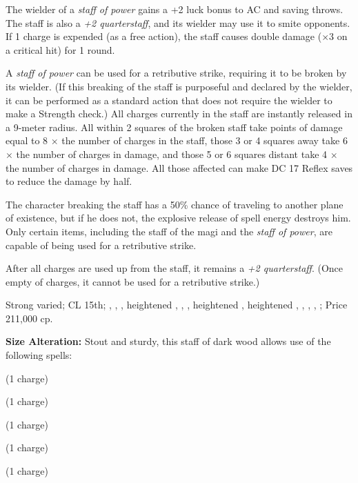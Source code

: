 The wielder of a \emph{staff of power} gains a +2 luck bonus to AC and saving throws. The staff is also a \emph{+2 quarterstaff}, and its wielder may use it to smite opponents. If 1 charge is expended (as a free action), the staff causes double damage ($\times$3 on a critical hit) for 1 round.

A \emph{staff of power} can be used for a retributive strike, requiring it to be broken by its wielder. (If this breaking of the staff is purposeful and declared by the wielder, it can be performed as a standard action that does not require the wielder to make a Strength check.) All charges currently in the staff are instantly released in a 9-meter radius. All within 2 squares of the broken staff take points of damage equal to 8 $\times$ the number of charges in the staff, those 3 or 4 squares away take 6 $\times$ the number of charges in damage, and those 5 or 6 squares distant take 4 $\times$ the number of charges in damage. All those affected can make DC 17 Reflex saves to reduce the damage by half.

The character breaking the staff has a 50\% chance of traveling to another plane of existence, but if he does not, the explosive release of spell energy destroys him. Only certain items, including the staff of the magi and the \emph{staff of power}, are capable of being used for a retributive strike.

After all charges are used up from the staff, it remains a \emph{+2 quarterstaff}. (Once empty of charges, it cannot be used for a retributive strike.)

Strong varied; CL 15th; , , , heightened , , , heightened , heightened , , , , ; Price 211,000 cp.

\textbf{Size Alteration:} Stout and sturdy, this staff of dark wood allows use of the following spells:
\begin{itemize*}
\item {} (1 charge)
\item {} (1 charge)
\item {} (1 charge)
\item {} (1 charge)
\item {} (1 charge)
\end{itemize*}

